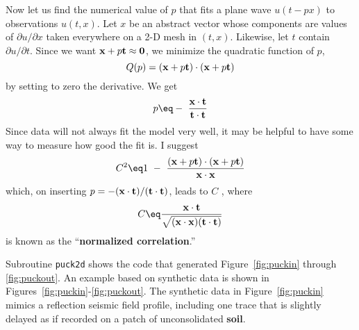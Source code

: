 \par
Now let us find the numerical value of $p$ that fits a plane wave $u(t-px)$ to  observations $u (t , x )$. Let $x$ be an abstract vector whose components are values of $\partial u /\partial x$ taken everywhere on a 2-D mesh in $(t,x)$. Likewise, let $t$ contain $\partial u /\partial t$.  Since we want ${\bf x} + p {\bf t} \approx {\bf 0}$, we minimize the quadratic function of $p$, 
\begin{equation}
Q( p) = ({\bf x} + p {\bf t}) \cdot ({\bf x} + p {\bf t}) 
\end{equation}
by setting to zero the derivative. We get 
\begin{equation}
p \eq - \ \frac{ {\bf x} \cdot {\bf t} }{ {\bf t} \cdot {\bf t} } 
\end{equation}
Since data will not always fit the model very well, it may be helpful to have some way to measure how good the fit is. I suggest
\begin{equation}
C^2 \eq 1 \ -\  \frac{ ({\bf x} + p {\bf t}) \cdot ({\bf x} + p {\bf t}) }{ {\bf x} \cdot {\bf x}} 
\end{equation}
which, on inserting $p=-({\bf x} \cdot {\bf t})/({\bf t} \cdot {\bf t})$, leads to $C$ , where 
\begin{equation}
C \eq \frac{ {\bf x} \cdot {\bf t} } { \sqrt{ ( {\bf x} \cdot {\bf x} ) ( {\bf t}\cdot{\bf t}) }}
\end{equation} 
is known as the ``{\bf normalized correlation}.''   






Subroutine {\tt puck2d} shows the code that generated
Figure~\ref{fig:puckin} through \ref{fig:puckout}.
An example based on synthetic data is shown
in Figures~\ref{fig:puckin}-\ref{fig:puckout}.
The synthetic data in Figure~\ref{fig:puckin} mimics
a reflection seismic field profile,
including one trace that is slightly delayed
as if recorded on a patch of unconsolidated {\bf soil}. 

